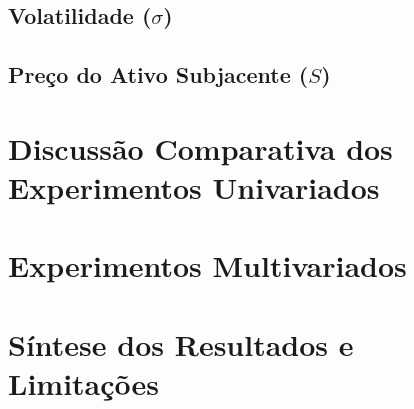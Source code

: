 \subsection{Volatilidade ($\sigma$)}
\label{subsec:resultados_sigma}



\subsection{Preço do Ativo Subjacente ($S$)}
\label{subsec:resultados_S}



\section{Discussão Comparativa dos Experimentos Univariados}
\label{sec:discussao_univariados}



\section{Experimentos Multivariados}
\label{sec:resultados_multivariados}



\section{Síntese dos Resultados e Limitações}
\label{sec:sintese_resultados}

